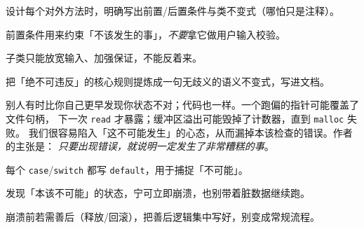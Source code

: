 \begin{actions}
\item 设计每个对外方法时，明确写出前置/后置条件与类不变式（哪怕只是注释）。
\item 前置条件用来约束「不该发生的事」，\emph{不要}拿它做用户输入校验。
\item 子类只能放宽输入、加强保证，不能反着来。
\item 把「绝不可违反」的核心规则提炼成一句无歧义的语义不变式，写进文档。
\end{actions}


\begin{ideabox}
别人有时比你自己更早发现你状态不对；代码也一样。一个跑偏的指针可能覆盖了文件句柄，
下一次 \texttt{read} 才暴露；缓冲区溢出可能毁掉了计数器，直到 \texttt{malloc} 失败。
我们很容易陷入「这不可能发生」的心态，从而漏掉本该检查的错误。作者的主张是：
\emph{只要出现错误，就说明一定发生了非常糟糕的事}。
\end{ideabox}

\begin{bitext}
\end{bitext}


\begin{actions}
\item 每个 \texttt{case}/\texttt{switch} 都写 \texttt{default}，用于捕捉「不可能」。
\item 发现「本该不可能」的状态，宁可立即崩溃，也别带着脏数据继续跑。
\item 崩溃前若需善后（释放/回滚），把善后逻辑集中写好，别变成常规流程。
\end{actions}

